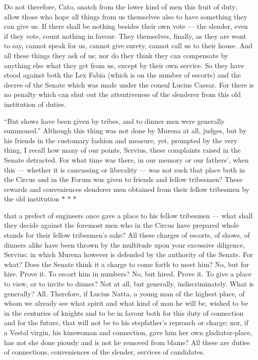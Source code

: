  Do not therefore, Cato, snatch from the lower kind of men this fruit of duty; allow those who hope all things from us themselves also to have something they can give us. If there shall be nothing besides their own vote --- the slender, even if they vote, count nothing in favour. They themselves, finally, as they are wont to say, cannot speak for us, cannot give surety, cannot call us to their house. And all these things they ask of us; nor do they think they can compensate by anything else what they get from us, except by their own service. So they have stood against both the Lex Fabia (which is on the number of escorts) and the decree of the Senate which was made under the consul Lucius Caesar. For there is no penalty which can shut out the attentiveness of the slenderer from this old institution of duties.

 ``But shows have been given by tribes, and to dinner men were generally summoned.'' Although this thing was not done by Murena at all, judges, but by his friends in the customary fashion and measure, yet, prompted by the very thing, I recall how many of our points, Servius, these complaints raised in the Senate detracted. For what time was there, in our memory or our fathers', when this --- whether it is canvassing or liberality --- was not such that place both in the Circus and in the Forum was given to friends and fellow tribesmen? These rewards and conveniences slenderer men obtained from their fellow tribesmen by the old institution * * *

 that a prefect of engineers once gave a place to his fellow tribesmen --- what shall they decide against the foremost men who in the Circus have prepared whole stands for their fellow tribesmen's sake? All these charges of escorts, of shows, of dinners alike have been thrown by the multitude upon your excessive diligence, Servius; in which Murena however is defended by the authority of the Senate. For what? Does the Senate think it a charge to come forth to meet him? No, but for hire. Prove it. To escort him in numbers? No, but hired. Prove it. To give a place to view, or to invite to dinner? Not at all, but generally, indiscriminately. What is generally? All. Therefore, if Lucius Natta, a young man of the highest place, of whom we already see what spirit and what kind of man he will be, wished to be in the centuries of knights and to be in favour both for this duty of connection and for the future, that will not be to his stepfather's reproach or charge; nor, if a Vestal virgin, his kinswoman and connection, gave him her own gladiator-place, has not she done piously and is not he removed from blame? All these are duties of connections, conveniences of the slender, services of candidates.

